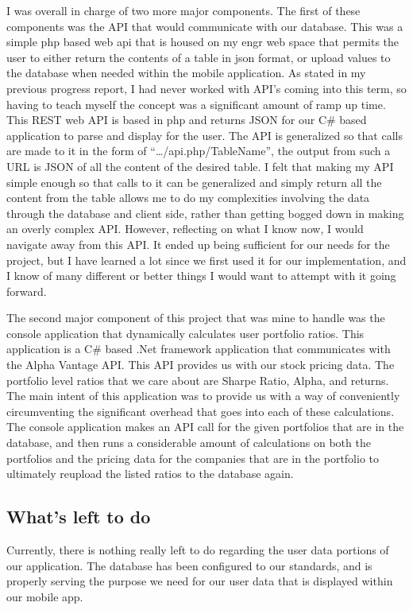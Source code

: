 \documentclass[letterpaper,10pt,titlepage,journal,compsoc,draftclsnofoot,onecolumn]{IEEEtran}
\begin{document}
I was overall in charge of two more major components. The first of these components was the API that would communicate with our database. This was a simple php based web api that is housed on my engr web space that permits the user to either return the contents of a table in json format, or upload values to the database when needed within the mobile application. As stated in my previous progress report, I had never worked with API's coming into this term, so having to teach myself the concept was a significant amount of ramp up time. This REST web API is based in php and returns JSON for our C\# based application to parse and display for the user.  The API is generalized so that calls are made to it in the form of “…/api.php/{TableName}”, the output from such a URL is JSON of all the content of the desired table. I felt that making my API simple enough so that calls to it can be generalized and simply return all the content from the table allows me to do my complexities involving the data  through the database and client side, rather than getting bogged down in making an overly complex API. However, reflecting on what I know now, I would navigate away from this API. It ended up being sufficient for our needs for the project, but I have learned a lot since we first used it for our implementation, and I know of many different or better things I would want to attempt with it going forward.

The second major component of this project that was mine to handle was the console application that dynamically calculates user portfolio ratios. This application is a C\# based .Net framework application that communicates with the Alpha Vantage API. This API provides us with our stock pricing data. The portfolio level ratios that we care about are Sharpe Ratio, Alpha, and returns. The main intent of this application was to provide us with a way of conveniently circumventing the significant overhead that goes into each of these calculations. The console application makes an API call for the given portfolios that are in the database, and then runs a considerable amount of calculations on both the portfolios and the pricing data for the companies that are in the portfolio to ultimately reupload the listed ratios to the database again. 

\subsection{What's left to do}

Currently, there is nothing really left to do regarding the user data portions of our application. The database has been configured to our standards, and is properly serving the purpose we need for our user data that is displayed within our mobile app.
\end{document}
